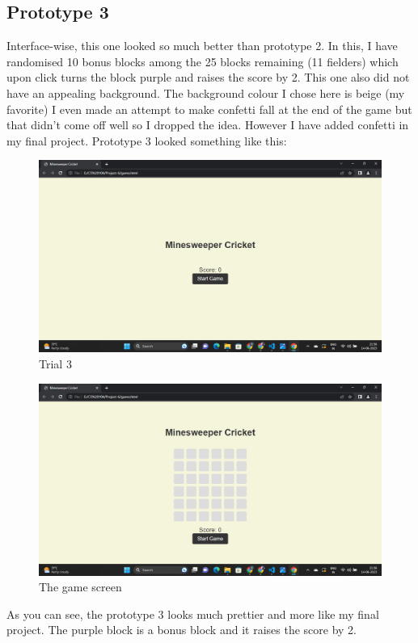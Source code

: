 \documentclass{article}
\begin{document}
\subsection{Prototype 3}
Interface-wise, this one looked so much better than prototype 2. In this, I have randomised 10 bonus blocks among the 25 blocks remaining (11 fielders) which upon click turns the block purple and raises the score by 2. This one also did not have an appealing background. The background colour I chose here is beige (my favorite) I even made an attempt to make confetti fall at the end of the game but that didn't come off well so I dropped the idea. However I have added confetti in my final project. Prototype 3 looked something like this:
\begin{figure}
[H]
   \includegraphics[width=\linewidth]{Screenshot (224).png}
   \caption{Trial 3}
\end{figure}
\begin{figure}
[H]
   \includegraphics[width=\linewidth]{Screenshot (225).png}
   \caption{The game screen}
\end{figure}
As you can see, the prototype 3 looks much prettier and more like my final project. The purple block is a bonus block and it raises the score by 2.
\end{document}
